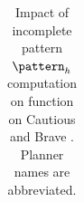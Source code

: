 \begin{table}[tb]
{\begin{tabular}{|l||cccccccccc||cccccccccc||}
        \end{tabular}}
        \caption{Impact of incomplete pattern $\pattern_h$ computation on function on Cautious and Brave \pattyd. Planner names are abbreviated.}
        \label{tab:abl-patternh-incomplete}
        \end{table}
        